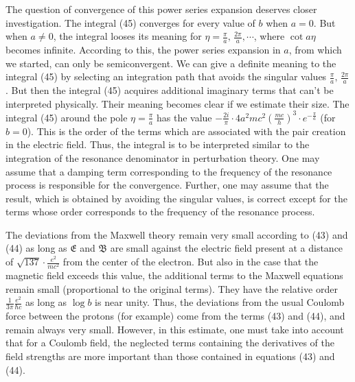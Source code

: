 \documentclass{article}
\begin{document}
The question of convergence of this power series expansion deserves closer investigation. The integral (45)
converges for every value of $ b$ when $ a=0 $. But when $ a \neq 0 $, the integral looses its meaning for
$ \eta = \frac{\pi }{a},\,  \frac{2 \pi }{a}, \cdots $, where $\cot a\eta $ becomes infinite. According to this, the power
series expansion in $ a $, from which we started, can only be semiconvergent. We can give a definite meaning
to the integral (45) by selecting an integration path that avoids the singular values
$ \frac{\pi }{a},\,  \frac{2 \pi }{a} $. But then the integral (45) acquires additional imaginary terms
that can't be interpreted physically. Their meaning becomes clear if we estimate their size.
The integral (45) around the pole $ \eta = \frac {\pi }{a} $ has the value
$ -\frac {2i}{\pi }\cdot 4 a^2 mc^2 (\frac {mc}{h})^3 \cdot e^{-\frac{\pi }{a}}$ (for $ b=0 $). This is the order of the terms
which are associated with the pair creation in the electric field. Thus, the integral is to be interpreted
similar to the integration of the resonance denominator in perturbation theory. One may assume that a damping
term corresponding to the frequency of the resonance process is responsible for the convergence. Further, one
may assume that the result, which is obtained by avoiding the singular values, is correct except for the terms
whose order corresponds to the frequency of the resonance process.

The deviations from the Maxwell theory remain very small according to (43) and (44) as long as $ \mathfrak{E} $
and $ \mathfrak{B} $ are small against the electric field present at a distance of
$ \sqrt{137} \cdot \frac{e^2}{mc^2} $ from the center of the electron. But also in the case that the magnetic field
exceeds this value, the additional terms to the Maxwell equations remain small (proportional to the original terms).
They have the relative order $ \frac {1}{3\pi} \frac{e^2}{\hbar c}$ as long as $ \log {b} $ is near unity. Thus,
the deviations from the usual Coulomb force between the protons (for example) come from the terms (43) and (44),
and remain always very small. However, in this estimate, one must take into account that for a Coulomb field, the
neglected terms containing the derivatives of the field strengths are more important than those contained
in equations (43) and (44).
\end{document}
